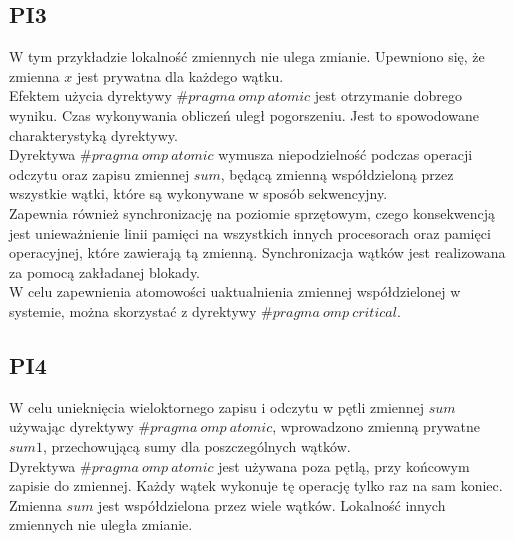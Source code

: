 \documentclass{article}
\begin{document}
\subsection{PI3}
W tym przykładzie lokalność zmiennych nie ulega zmianie. Upewniono się, że zmienna $x$ jest prywatna dla każdego wątku.\\
Efektem użycia dyrektywy $\#pragma\:omp\:atomic$ jest otrzymanie dobrego wyniku. Czas wykonywania obliczeń uległ pogorszeniu. Jest to spowodowane charakterystyką dyrektywy.\\
Dyrektywa $\#pragma\:omp\:atomic$ wymusza niepodzielność podczas operacji\\
odczytu oraz zapisu zmiennej $sum$, będącą zmienną współdzieloną przez wszystkie wątki, które są wykonywane w sposób sekwencyjny. \\
Zapewnia również synchronizację na poziomie sprzętowym, czego konsekwencją jest unieważnienie linii pamięci na wszystkich innych procesorach oraz pamięci operacyjnej, które zawierają tą zmienną. Synchronizacja wątków jest realizowana za pomocą zakładanej blokady.\\
W celu zapewnienia atomowości uaktualnienia zmiennej współdzielonej w systemie, można skorzystać z dyrektywy $\#pragma\:omp\:critical$.
\subsection{PI4}
W celu unieknięcia wieloktornego zapisu i odczytu w pętli zmiennej $sum$ używając dyrektywy $\#pragma\:omp\:atomic$, wprowadzono zmienną prywatne\\
$sum1$, przechowującą sumy dla poszczególnych wątków. \\
Dyrektywa $\#pragma\:omp\:atomic$ jest używana poza pętlą, przy
końcowym zapisie do zmiennej. Każdy wątek wykonuje tę operację tylko raz na sam koniec.\\
Zmienna $sum$ jest współdzielona przez wiele wątków. Lokalność innych zmiennych nie uległa zmianie. 
\end{document}

